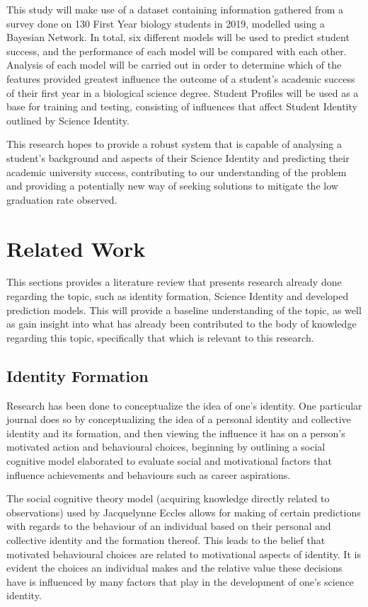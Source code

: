 \documentclass[conference]{IEEEtran}
\begin{document}
This study will make use of a dataset containing information gathered from a survey done on 130 First Year biology students in 2019, modelled using a Bayesian Network. In total, six different models will be used to predict student success, and the performance of each model will be compared with each other. Analysis of each model will be carried out in order to determine which of the features provided greatest influence the outcome of a student's academic success of their first year in a biological science degree. Student Profiles will be used as a base for training and testing, consisting of influences that affect Student Identity outlined by Science Identity.

This research hopes to provide a robust system that is capable of analysing a student's background and aspects of their Science Identity and predicting their academic university success, contributing to our understanding of the problem and providing a potentially new way of seeking solutions to mitigate the low graduation rate observed.

\section{Related Work}

This sections provides a literature review that presents research already done regarding the topic, such as identity formation, Science Identity and developed prediction models. This will provide a baseline understanding of the topic, as well as gain insight into what has already been contributed to the body of knowledge regarding this topic, specifically that which is relevant to this research.

\subsection{Identity Formation}

Research has been done to conceptualize the idea of one's identity. One particular journal \cite{b4} does so by conceptualizing the idea of a personal identity and collective identity and its formation, and then viewing the influence it has on a person’s motivated action and behavioural choices, beginning by outlining a social cognitive model elaborated to evaluate social and motivational factors that influence achievements and behaviours such as career aspirations.

The social cognitive theory model (acquiring knowledge directly related to observations) used by Jacquelynne Eccles \cite{b4} allows for making of certain predictions with regards to the behaviour of an individual based on their personal and collective identity and the formation thereof. This leads to the belief that motivated behavioural choices are related to motivational aspects of identity. It is evident the choices an individual makes and the relative value these decisions have is influenced by many factors that play in the development of one’s science identity. 
\end{document}

